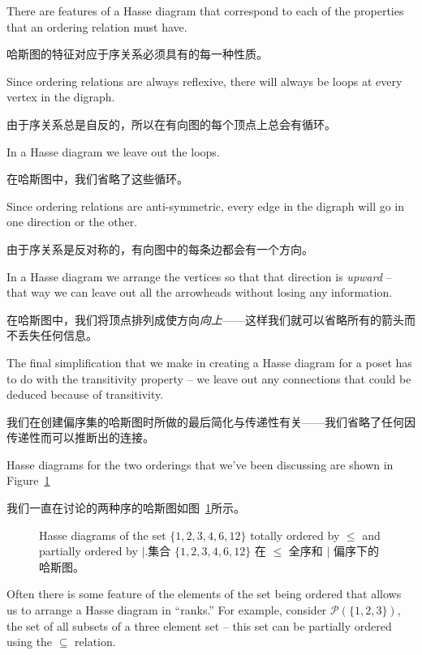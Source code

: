 There
are features of a Hasse diagram that correspond to each of the 
properties that an ordering relation must have.

哈斯图的特征对应于序关系必须具有的每一种性质。

Since ordering relations are always reflexive, there will always 
be loops at every vertex in the digraph.

由于序关系总是自反的，所以在有向图的每个顶点上总会有循环。

In a Hasse diagram we
leave out the loops.

在哈斯图中，我们省略了这些循环。

Since ordering relations are anti-symmetric, every edge in the digraph
will go in one direction or the other.

由于序关系是反对称的，有向图中的每条边都会有一个方向。

In a Hasse diagram we arrange
the vertices so that that direction is \emph{upward} -- that way we
can leave out all the arrowheads without losing any information.

在哈斯图中，我们将顶点排列成使方向\emph{向上}——这样我们就可以省略所有的箭头而不丢失任何信息。

The final simplification that we make in creating a Hasse diagram for
a poset has to do with the transitivity property -- we leave out any
connections that could be deduced because of transitivity.

我们在创建偏序集的哈斯图时所做的最后简化与传递性有关——我们省略了任何因传递性而可以推断出的连接。

Hasse diagrams for the two orderings that we've been discussing are 
shown in Figure~\ref{fig:hasse_diag}

我们一直在讨论的两种序的哈斯图如图~\ref{fig:hasse_diag}所示。

\begin{figure}[!hbt]

\caption[Some simple Hasse diagrams.一些简单的哈斯图。]{Hasse diagrams of the set $\{1,2,3,4,6,12\}$ %
totally ordered by $\leq$ and partially ordered by $\mid$.集合 $\{1,2,3,4,6,12\}$ 在 $\leq$ 全序和 $\mid$ 偏序下的哈斯图。}
\label{fig:hasse_diag} 
\end{figure}

Often there is some feature of the elements of the set being ordered
that allows us to arrange a Hasse diagram in ``ranks.''  For example,
consider ${\mathcal P}(\{1,2,3\})$, the set of all subsets of a three
element set -- this set can be partially ordered using the $\subseteq$ 
relation.

